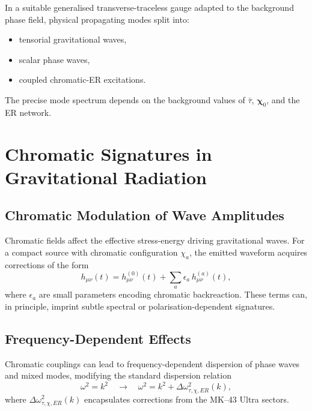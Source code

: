 In a suitable generalised transverse-traceless gauge adapted to the background phase field, physical propagating modes split into:
\begin{itemize}
  \item tensorial gravitational waves,
  \item scalar phase waves,
  \item coupled chromatic-ER excitations.
\end{itemize}
The precise mode spectrum depends on the background values of $\bar{\tau}$, $\bm{\chi}_0$, and the ER network.


\chapter{Chromatic Signatures in Gravitational Radiation}

\section{Chromatic Modulation of Wave Amplitudes}

Chromatic fields affect the effective stress-energy driving gravitational waves.
For a compact source with chromatic configuration $\chi_a$, the emitted waveform acquires corrections of the form
\[
h_{\mu\nu}(t)
=
h^{(0)}_{\mu\nu}(t)
+
\sum_a \epsilon_a\, h^{(a)}_{\mu\nu}(t),
\]
where $\epsilon_a$ are small parameters encoding chromatic backreaction.
These terms can, in principle, imprint subtle spectral or polarisation-dependent signatures.

\section{Frequency-Dependent Effects}

Chromatic couplings can lead to frequency-dependent dispersion of phase waves and mixed modes, modifying the standard dispersion relation
\[
\omega^2 = k^2 \quad \longrightarrow \quad
\omega^2 = k^2 + \Delta\omega^2_{\tau,\chi,ER}(k),
\]
where $\Delta\omega^2_{\tau,\chi,ER}(k)$ encapsulates corrections from the MK--43 Ultra sectors.



